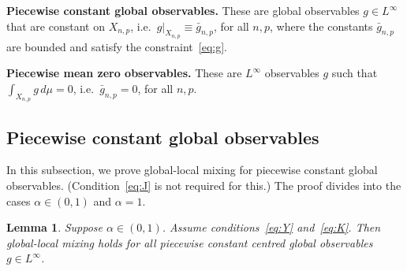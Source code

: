 \documentclass[12pt]{article}
\numberwithin{equation}{section}
\newtheorem{lemma}[thm]{Lemma}
\begin{document}
\vspace{1ex}
\noindent
\textbf{Piecewise constant global observables.}
These are global observables $g\in L^\infty$ that are constant on $X_{n,p}$, i.e.\ $g|_{X_{n,p}}\equiv \bar g_{n,p}$, for all $n,p$, where the constants $\bar g_{n,p}$ are bounded and satisfy the constraint~\eqref{eq:g}.

\vspace{1ex}
\noindent
\textbf{Piecewise mean zero observables.}
These are $L^\infty$ observables $g$ such that 
$\int_{X_{n,p}}g\,d\mu=0$, i.e.\ $\bar g_{n,p}=0$, for all $n,p$.

\subsection{Piecewise constant global observables}
\label{sec:pwc}

In this subsection, we prove global-local mixing for piecewise constant global observables. (Condition~\eqref{eq:J} is not required for this.)
The proof divides into the cases $\alpha\in(0,1)$ and $\alpha=1$.


\begin{lemma} \label{lem:pwc}
Suppose $\alpha\in(0,1)$.  Assume
conditions~\eqref{eq:Y} and~\eqref{eq:K}.
Then global-local mixing holds for all piecewise constant centred global observables $g\in L^\infty$.
\end{lemma}
\end{document}
